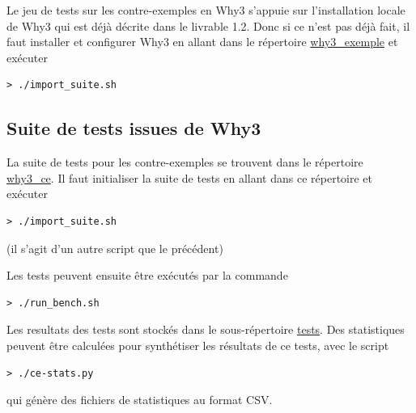 \documentclass[a4paper,11pt]{article}
\begin{document}
Le jeu de tests sur les contre-exemples en Why3 s'appuie sur
l'installation locale de Why3 qui est déjà décrite dans le livrable
1.2. Donc si ce n'est pas déjà fait, il faut installer et configurer Why3 en allant dans le répertoire \url{why3_exemple} et exécuter
\begin{lstlisting}
> ./import_suite.sh
\end{lstlisting}

\subsection{Suite de tests issues de Why3}

La suite de tests pour les contre-exemples se trouvent dans le
répertoire \url{why3_ce}. Il faut initialiser la suite de tests en
allant dans ce répertoire et exécuter
\begin{lstlisting}
> ./import_suite.sh
\end{lstlisting}
(il s'agit d'un autre script que le précédent)

Les tests peuvent ensuite être exécutés par la commande
\begin{lstlisting}
> ./run_bench.sh
\end{lstlisting}
Les resultats des tests sont stockés dans le sous-répertoire
\url{tests}. Des statistiques peuvent être calculées pour synthétiser
les résultats de ce tests, avec le script
\begin{lstlisting}
> ./ce-stats.py
\end{lstlisting}
qui génère des fichiers de statistiques au format CSV.
\end{document}

